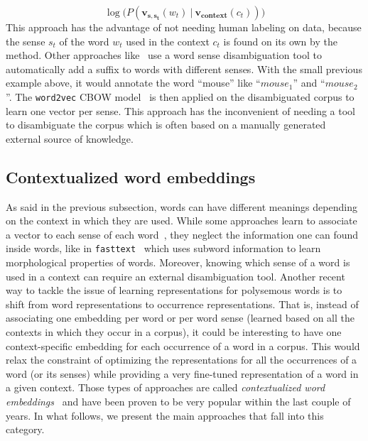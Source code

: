    \begin{equation}
      \log\big(P(\mathbf{v_{s, s_t}}(w_t)~|~\mathbf{v_{context}}(c_t))\big)
    \end{equation}
    This approach has the advantage of not needing human labeling on data,
    because the sense $s_t$ of the word $w_t$ used in the context $c_t$ is found
    on its own by the method. Other approaches
    like~\citep{iacobacci2015sensembed} use a word sense disambiguation tool to
    automatically add a suffix to words with different senses. With the small
    previous example above, it would annotate the word ``mouse'' like
    ``$mouse_1$'' and ``$mouse_2$''. The \texttt{word2vec} CBOW
    model~\citep{mikolov2013efficient} is then applied on the disambiguated
    corpus to learn one vector per sense. This approach has the inconvenient of
    needing a tool to disambiguate the corpus which is often based on a manually
    generated external source of knowledge.

  \subsection{Contextualized word embeddings}
    As said in the previous subsection, words can have different meanings
    depending on the context in which they are used. While some approaches learn
    to associate a vector to each sense of each
    word~\citep{neelakantan2014efficient, iacobacci2015sensembed}, they neglect
    the information one can found inside words, like in \texttt{fasttext}
    ~\citep{bojanowski2016enriching}which uses subword information to learn
    morphological properties of words. Moreover, knowing which sense of a word
    is used in a context can require an external disambiguation tool. Another
    recent way to tackle the issue of learning representations for polysemous
    words is to shift from word representations to occurrence representations.
    That is, instead of associating one embedding per word or per word sense
    (learned based on all the contexts in which they occur in a corpus), it
    could be interesting to have one context-specific embedding for each
    occurrence of a word in a corpus. This would relax the constraint of
    optimizing the representations for all the occurrences of a word (or its
    senses) while providing a very fine-tuned representation of a word in a
    given context. Those types of approaches are called \textit{contextualized
    word embeddings}~\citep{peters2018elmo, devlin2019bert, liu2019roberta} and
    have been proven to be very popular within the last couple of years. In what
    follows, we present the main approaches that fall into this category.
    \medskip

